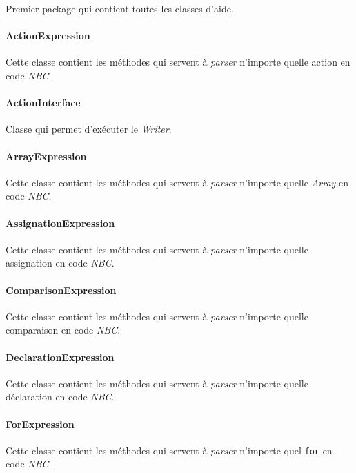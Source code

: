 Premier package qui contient toutes les classes d'aide.

\paragraph{ActionExpression}

Cette classe contient les méthodes qui servent à \emph{parser} n'importe quelle action en code \emph{NBC}.

\paragraph{ActionInterface}

Classe qui permet d'exécuter le \emph{Writer}.

\paragraph{ArrayExpression}

Cette classe contient les méthodes qui servent à \emph{parser} n'importe quelle \emph{Array} en code \emph{NBC}.

\paragraph{AssignationExpression}

Cette classe contient les méthodes qui servent à \emph{parser} n'importe quelle assignation en code \emph{NBC}.

\paragraph{ComparisonExpression}

Cette classe contient les méthodes qui servent à \emph{parser} n'importe quelle comparaison en code \emph{NBC}.

\paragraph{DeclarationExpression}

Cette classe contient les méthodes qui servent à \emph{parser} n'importe quelle déclaration en code \emph{NBC}.

\paragraph{ForExpression}

Cette classe contient les méthodes qui servent à \emph{parser} n'importe quel \texttt{for} en code \emph{NBC}.

